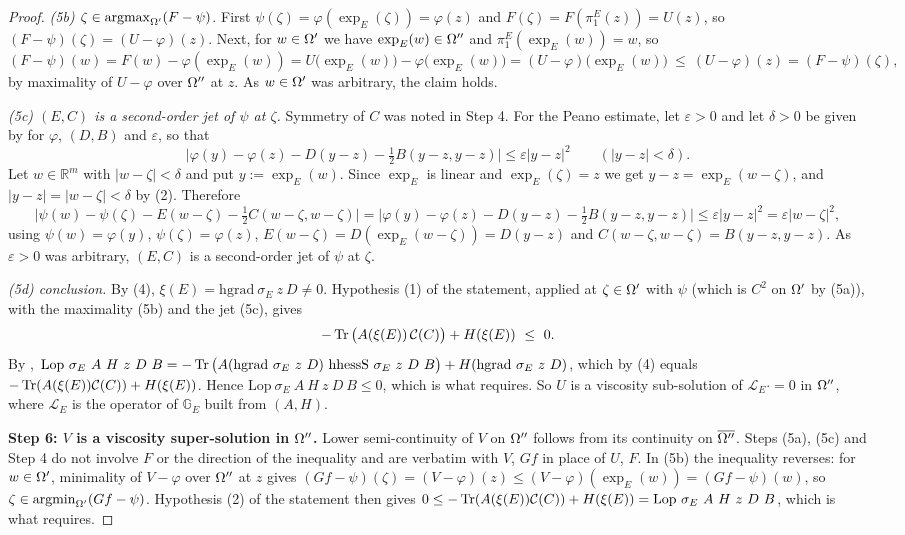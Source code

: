 \begin{proof}
\emph{(5b) $\zeta\in\operatorname*{argmax}_{\Omega'}(F-\psi)$.} First
$\psi(\zeta)=\varphi(\exp_E(\zeta))=\varphi(z)$ and
$F(\zeta)=F(\pi_1^E(z))=U(z)$, so $(F-\psi)(\zeta)=(U-\varphi)(z)$. Next, for $w\in\Omega'$ we
have $\exp_E(w)\in\Omega''$ and $\pi_1^E(\exp_E(w))=w$, so
\[
 (F-\psi)(w)=F(w)-\varphi(\exp_E(w))=U\big(\exp_E(w)\big)-\varphi\big(\exp_E(w)\big)
 =(U-\varphi)\big(\exp_E(w)\big)\ \le\ (U-\varphi)(z)=(F-\psi)(\zeta),
\]
by maximality of $U-\varphi$ over $\Omega''$ at $z$. As $w\in\Omega'$ was arbitrary, the claim
holds.

\emph{(5c) $(E,C)$ is a second-order jet of $\psi$ at $\zeta$.} Symmetry of $C$ was noted in
Step 4. For the Peano estimate, let $\varepsilon>0$ and let $\delta>0$ be given by
 for $\varphi$, $(D,B)$ and $\varepsilon$, so that
\[
 \Big|\varphi(y)-\varphi(z)-D(y-z)-\tfrac12B(y-z,y-z)\Big|\le\varepsilon|y-z|^{2}
 \qquad(|y-z|<\delta).
\]
Let $w\in\mathbb R^{m}$ with $|w-\zeta|<\delta$ and put $y:=\exp_E(w)$. Since $\exp_E$ is
linear and $\exp_E(\zeta)=z$ we get $y-z=\exp_E(w-\zeta)$, and $|y-z|=|w-\zeta|<\delta$ by
(2). Therefore
\[
 \Big|\psi(w)-\psi(\zeta)-E(w-\zeta)-\tfrac12C(w-\zeta,w-\zeta)\Big|
 =\Big|\varphi(y)-\varphi(z)-D(y-z)-\tfrac12B(y-z,y-z)\Big|
 \le\varepsilon|y-z|^{2}=\varepsilon|w-\zeta|^{2},
\]
using $\psi(w)=\varphi(y)$, $\psi(\zeta)=\varphi(z)$, $E(w-\zeta)=D(\exp_E(w-\zeta))=D(y-z)$
and $C(w-\zeta,w-\zeta)=B(y-z,y-z)$. As $\varepsilon>0$ was arbitrary, $(E,C)$ is a
second-order jet of $\psi$ at $\zeta$.

\emph{(5d) conclusion.} By (4), $\xi(E)=\mathrm{hgrad}\ \sigma_E\ z\ D\ne0$. Hypothesis (1)
of the statement, applied at $\zeta\in\Omega'$ with $\psi$ (which is $C^{2}$ on $\Omega'$ by (5a)),
with the maximality (5b) and the jet (5c), gives
\[
 -\Tr\big(A(\xi(E))\,\mathcal C(C)\big)+H(\xi(E))\ \le\ 0 .
\]
By ,
$\mathrm{Lop}\ \sigma_E\ A\ H\ z\ D\ B
=-\Tr\big(A(\mathrm{hgrad}\ \sigma_E\ z\ D)\ \mathrm{hhessS}\ \sigma_E\ z\ D\ B\big)
+H(\mathrm{hgrad}\ \sigma_E\ z\ D)$, which by (4) equals
$-\operatorname{Tr}(A(\xi(E))\mathcal C(C))+H(\xi(E))$. Hence
$\mathrm{Lop}\ \sigma_E\ A\ H\ z\ D\ B\le0$, which is what  requires.
So $U$ is a viscosity sub-solution of $\mathcal L_E\cdot=0$ in $\Omega''$, where
$\mathcal L_E$ is the operator of $\mathbb G_E$ built from $(A,H)$.

\medskip\noindent\textbf{Step 6: $V$ is a viscosity super-solution in $\Omega''$.} Lower
semi-continuity of $V$ on $\Omega''$ follows from its continuity on $\overline{\Omega''}$. Steps
(5a), (5c) and Step 4 do not involve $F$ or the direction of the inequality and are verbatim
with $V$, $Gf$ in place of $U$, $F$. In (5b) the inequality reverses: for $w\in\Omega'$,
minimality of $V-\varphi$ over $\Omega''$ at $z$ gives
$(Gf-\psi)(\zeta)=(V-\varphi)(z)\le(V-\varphi)(\exp_E(w))=(Gf-\psi)(w)$, so
$\zeta\in\operatorname*{argmin}_{\Omega'}(Gf-\psi)$. Hypothesis (2) of the statement then gives
$0\le-\operatorname{Tr}(A(\xi(E))\mathcal C(C))+H(\xi(E))=\mathrm{Lop}\ \sigma_E\ A\ H\ z\ D\ B$, which is
what  requires.


\end{proof}
